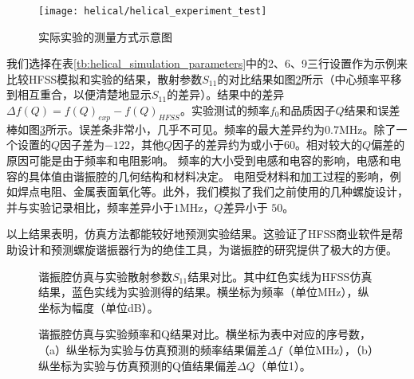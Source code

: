 \begin{figure}
    \centering
    \caption[实际实验的测量方式示意图]{实际实验的测量方式示意图\label{fig:helical_experiment_test}}
    \texttt{[image: helical/helical\_experiment\_test]}
\end{figure}

我们选择在表\ref{tb:helical_simulation_parameters}中的2、6、9三行设置作为示例来比较HFSS模拟和实验的结果，散射参数$S_{11}$的对比结果如图\ref{fig:helical_compares}所示（中心频率平移到相互重合，以便清楚地显示$S_{11}$的差异）。结果中的差异$\Delta f(Q)=f(Q)_{exp}-f(Q)_{HFSS}$。实验测试的频率$f_0$和品质因子$Q$结果和误差棒如图\ref{fig:helical_compares_f_q}所示。误差条非常小，几乎不可见。频率的最大差异约为$0.7$MHz。除了一个设置的$Q$因子差为$-122$，其他$Q$因子的差异约为或小于$60$。相对较大的$Q$偏差的原因可能是由于频率和电阻影响。
频率的大小受到电感和电容的影响，电感和电容的具体值由谐振腔的几何结构和材料决定。
电阻受材料和加工过程的影响，例如焊点电阻、金属表面氧化等。此外，我们模拟了我们之前使用的几种螺旋设计，并与实验记录相比，频率差异小于$1$MHz，$Q$差异小于 $50$。

以上结果表明，仿真方法都能较好地预测实验结果。这验证了HFSS商业软件是帮助设计和预测螺旋谐振器行为的绝佳工具，为谐振腔的研究提供了极大的方便。

\begin{figure}
    \centering
    \caption[谐振腔仿真与实验散射参数结果对比]{谐振腔仿真与实验散射参数$S_{11}$结果对比。其中红色实线为HFSS仿真结果，蓝色实线为实验测得的结果。横坐标为频率（单位MHz），纵坐标为幅度（单位dB）。\label{fig:helical_compares}}
\end{figure}


\begin{figure}
    \centering
    \caption[谐振腔仿真与实验频率和Q结果对比]{谐振腔仿真与实验频率和Q结果对比。横坐标为表中对应的序号数，（a）纵坐标为实验与仿真预测的频率结果偏差$\Delta f$（单位MHz），（b）纵坐标为实验与仿真预测的Q值结果偏差$\Delta Q$（单位1）。\label{fig:helical_compares_f_q}}
\end{figure}

